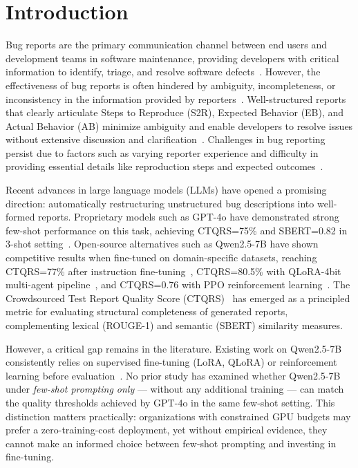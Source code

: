\section{Introduction}
\label{sec:intro}

Bug reports are the primary communication channel between end users and 
development teams in software maintenance, providing developers with 
critical information to identify, triage, and resolve software defects~\cite{acharya2025bugquality}. 
However, the effectiveness of bug reports is often hindered by ambiguity, 
incompleteness, or inconsistency in the information provided by 
reporters~\cite{acharya2025bugquality}. Well-structured reports that clearly articulate 
Steps to Reproduce (S2R), Expected Behavior (EB), and Actual Behavior (AB) 
minimize ambiguity and enable developers to resolve issues without extensive 
discussion and clarification~\cite{acharya2025bugquality}. Challenges in bug reporting 
persist due to factors such as varying reporter experience and difficulty in 
providing essential details like reproduction steps and expected 
outcomes~\cite{acharya2025bugquality}.

Recent advances in large language models (LLMs) have opened a promising 
direction: automatically restructuring unstructured bug descriptions into 
well-formed reports. Proprietary models such as GPT-4o have demonstrated 
strong few-shot performance on this task, achieving CTQRS=75\% and 
SBERT=0.82 in 3-shot setting~\cite{acharya2025bugquality}. Open-source 
alternatives such as Qwen2.5-7B have shown competitive results when 
fine-tuned on domain-specific datasets, reaching CTQRS=77\% after 
instruction fine-tuning~\cite{acharya2025bugquality}, CTQRS=80.5\% with 
QLoRA-4bit multi-agent pipeline~\cite{choi2025agentreport}, and 
CTQRS=0.76 with PPO reinforcement learning~\cite{yang2025ctqrsrl}. 
The Crowdsourced Test Report Quality Score (CTQRS)~\cite{zhang2022ctqrs} 
has emerged as a principled metric for evaluating structural completeness 
of generated reports, complementing lexical (ROUGE-1) and semantic (SBERT) 
similarity measures.

However, a critical gap remains in the literature. Existing work on 
Qwen2.5-7B consistently relies on supervised fine-tuning (LoRA, QLoRA) or 
reinforcement learning before evaluation~\cite{acharya2025bugquality, choi2025agentreport, yang2025ctqrsrl}. 
No prior study has examined whether Qwen2.5-7B under \emph{few-shot prompting only} 
--- without any additional training --- can match the quality thresholds 
achieved by GPT-4o in the same few-shot setting. This distinction matters 
practically: organizations with constrained GPU budgets may prefer a 
zero-training-cost deployment, yet without empirical evidence, they cannot 
make an informed choice between few-shot prompting and investing in fine-tuning.

